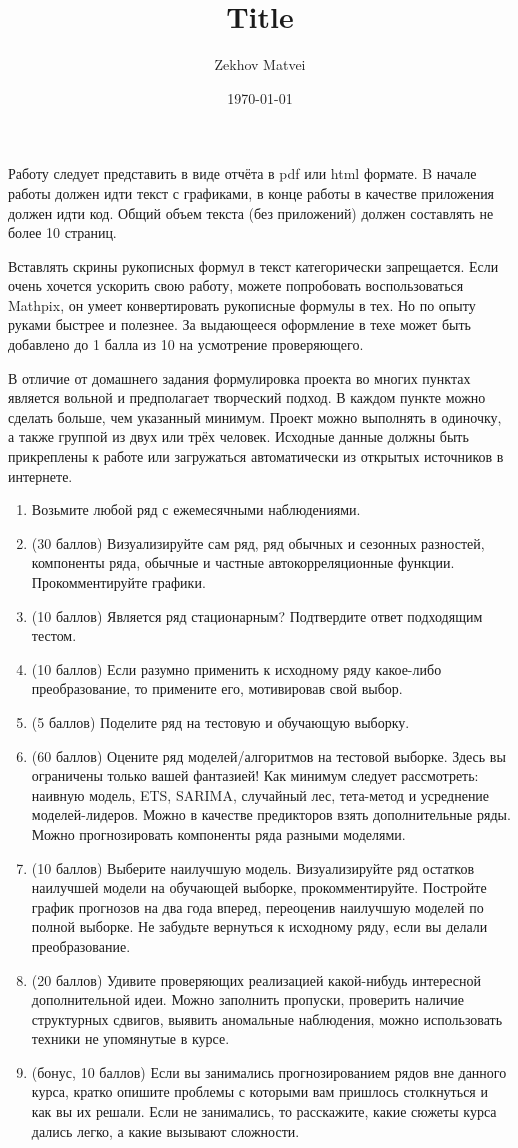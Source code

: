 \documentclass[a4paper,12pt]{article}
\author{Zekhov Matvei}
\title{Title}
\date{\today}
\begin{document}
	Работу следует представить в виде отчёта в pdf или html формате. B начале работы должен идти текст с графиками, в конце работы в качестве приложения должен идти код. Общий объем текста (без приложений) должен составлять не более 10 страниц.
	
	Вставлять скрины рукописных формул в текст категорически запрещается. Если очень хочется ускорить свою работу, можете попробовать воспользоваться Mathpix, он умеет конвертировать рукописные формулы в тех. Но по опыту руками быстрее и полезнее. За выдающееся оформление в техе может быть добавлено до 1 балла из 10 на усмотрение проверяющего.
	
	В отличие от домашнего задания формулировка проекта во многих пунктах является вольной и предполагает творческий подход. В каждом пункте можно сделать больше, чем указанный минимум.
	Проект можно выполнять в одиночку, а также группой из двух или трёх человек.
	Исходные данные должны быть прикреплены к работе или загружаться автоматически из открытых источников в интернете.
	
	
	\begin{enumerate}
	

	\item Возьмите любой ряд с ежемесячными наблюдениями.
	\item (30 баллов) Визуализируйте сам ряд, ряд обычных и сезонных разностей, компоненты ряда, обычные и частные автокорреляционные функции.
	Прокомментируйте графики.
	\item (10 баллов) Является ряд стационарным?
	Подтвердите ответ подходящим тестом.
	\item (10 баллов) Если разумно применить к исходному ряду какое-либо преобразование, то примените его, мотивировав свой выбор.
	\item (5 баллов) Поделите ряд на тестовую и обучающую выборку.
	\item (60 баллов) Оцените ряд моделей/алгоритмов на тестовой выборке.
	Здесь вы ограничены только вашей фантазией! Как минимум следует рассмотреть: наивную модель, ETS, SARIMA, случайный лес, тета-метод и усреднение моделей-лидеров. Можно в качестве предикторов взять дополнительные ряды. Можно прогнозировать компоненты ряда разными моделями.
	\item (10 баллов) Выберите наилучшую модель.
	Визуализируйте ряд остатков наилучшей модели на обучающей выборке, прокомментируйте. Постройте график прогнозов на два года вперед, переоценив наилучшую моделей по полной выборке. Не забудьте вернуться к исходному ряду, если вы делали преобразование.
	\item (20 баллов) Удивите проверяющих реализацией какой-нибудь интересной дополнительной идеи.
	Можно заполнить пропуски, проверить наличие структурных сдвигов, выявить аномальные наблюдения, можно использовать техники не упомянутые в курсе.
	\item (бонус, 10 баллов) Если вы занимались прогнозированием рядов вне данного курса, кратко опишите проблемы с которыми вам пришлось столкнуться и как вы их решали. Если не занимались, то расскажите, какие сюжеты курса дались легко, а какие вызывают сложности.
	\end{enumerate}
\end{document}
